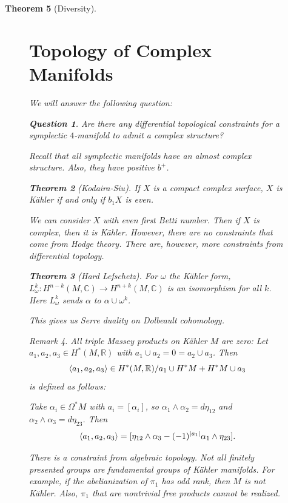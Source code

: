 \documentclass[leqno, openany]{memoir}
\DeclarePairedDelimiter{\gen}{\langle}{\rangle}
\newtheorem{thm}{Theorem}[chapter]
\newtheorem{quest}[thm]{Question}
\theoremstyle{definition}
\theoremstyle{remark}
\newtheorem{rmk}[thm]{Remark}
\theoremstyle{plain}
\theoremstyle{definition}
\theoremstyle{remark}
\newcommand{\R}{\mathbb{R}}
\newcommand{\C}{\mathbb{C}}
\begin{document}
\begin{thm}[Diversity]
\begin{figure}[H]
\section{Topology of Complex Manifolds}%
\label{sec:topology_of_complex_manifolds}

We will answer the following question: \begin{quest} Are there any differential
topological constraints for a symplectic $4$-manifold to admit a complex
structure?  \end{quest}

Recall that all symplectic manifolds have an almost complex structure. Also,
they have positive $b^+$.

\begin{thm}[Kodaira-Siu] If $X$ is a compact complex surface, $X$ is K\"ahler
if and only if $b_1 X$ is even.  \end{thm}

We can consider $X$ with even first Betti number. Then if $X$ is complex, then
it is K\"ahler. However, there are no constraints that come from Hodge theory.
There are, however, more constraints from differential topology.

\begin{thm}[Hard Lefschetz] For $\omega$ the K\"ahler form, $L_{\omega}^k:
H^{n-k}(M, \C) \to H^{n+k}(M, \C)$ is an isomorphism for all $k$. Here
$L_{\omega}^k$ sends $\alpha$ to $\alpha \cup \omega^k$.  \end{thm}

This gives us Serre duality on Dolbeault cohomology.

\begin{rmk} All \textit{triple Massey products} on K\"ahler $M$ are zero: Let
    $a_1, a_2, a_3 \in H^*(M, \R)$ with $a_1 \cup a_2 = 0 = a_2 \cup a_3$. Then
    \[ \gen{a_1, a_2, a_3} \in H^*(M, \R)/ a_1 \cup H^*M + H^*M \cup a_3 \] is
    defined as follows:

    Take $\alpha_i \in \Omega^*M$ with $a_i = [\alpha_i]$, so $\alpha_1 \wedge
    \alpha_2 = d \eta_{12}$ and $\alpha_2 \wedge \alpha_3 = d\eta_{23}$. Then
    \[ \gen{a_1, a_2, a_3} = [\eta_{12} \wedge \alpha_3 - (-1)^{\abs{a_1}}
    \alpha_1 \wedge \eta_{23}]. \] \end{rmk}

There is a constraint from algebraic topology. Not all finitely presented
groups are fundamental groups of K\"ahler manifolds. For example, if the
abelianization of $\pi_1$ has odd rank, then $M$ is not K\"ahler. Also, $\pi_1$
that are nontrivial free products cannot be realized.


\end{figure}
\end{thm}
\end{document}
